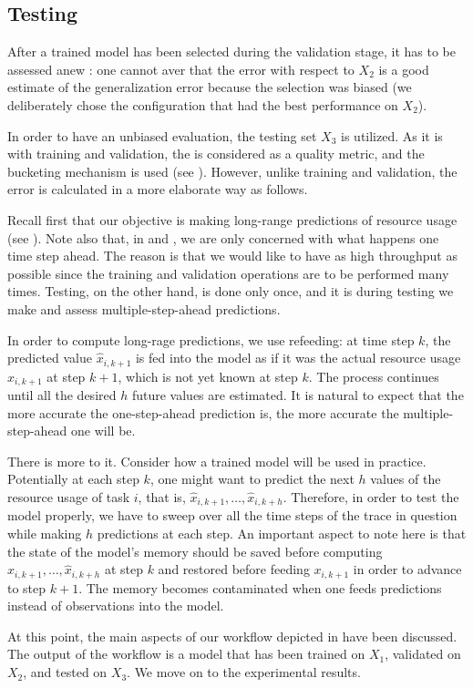 \subsection{Testing} 
After a trained model has been selected during the validation stage, it has to
be assessed anew \cite{hastie2009}: one cannot aver that the error with respect
to $X_2$ is a good estimate of the generalization error because the selection
was biased (we deliberately chose the configuration that had the best
performance on $X_2$).

In order to have an unbiased evaluation, the testing set $X_3$ is utilized. As
it is with training and validation, the  is considered as a quality
metric, and the bucketing mechanism is used (see ). However,
unlike training and validation, the error is calculated in a more elaborate way
as follows.

Recall first that our objective is making long-range predictions of resource
usage (see ). Note also that, in  and
, we are only concerned with what happens one time step ahead.
The reason is that we would like to have as high throughput as possible since
the training and validation operations are to be performed many times. Testing,
on the other hand, is done only once, and it is during testing we make and
assess multiple-step-ahead predictions.

In order to compute long-rage predictions, we use refeeding: at time step $k$,
the predicted value $\hat{x}_{i,k + 1}$ is fed into the model as if it was the
actual resource usage $x_{i,k + 1}$ at step $k + 1$, which is not yet known at
step $k$. The process continues until all the desired $h$ future values are
estimated. It is natural to expect that the more accurate the one-step-ahead
prediction is, the more accurate the multiple-step-ahead one will be.

There is more to it. Consider how a trained model will be used in practice.
Potentially at each step $k$, one might want to predict the next $h$ values of
the resource usage of task $i$, that is, $\hat{x}_{i,k + 1}, \dots, \hat{x}_{i,k
+ h}$. Therefore, in order to test the model properly, we have to sweep over all
the time steps of the trace in question while making $h$ predictions at each
step. An important aspect to note here is that the state of the model's memory
should be saved before computing $\hat{x}_{i,k + 1}, \dots, \hat{x}_{i,k + h}$
at step $k$ and restored before feeding $x_{i,k + 1}$ in order to advance to
step $k + 1$. The memory becomes contaminated when one feeds predictions instead
of observations into the model.

At this point, the main aspects of our workflow depicted in  have
been discussed. The output of the workflow is a model that has been trained on
$X_1$, validated on $X_2$, and tested on $X_3$. We move on to the experimental
results.
